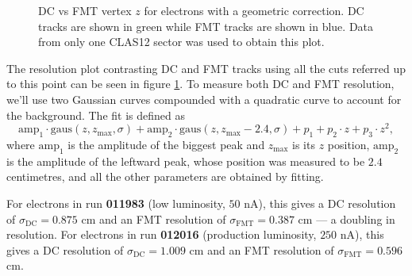     \begin{figure}[b!]
        \centering{}
        \caption[DC vs FMT $z$ with geometry correction]{DC vs FMT vertex $z$ for electrons with a geometric correction. DC tracks are shown in green while FMT tracks are shown in blue. Data from only one CLAS12 sector was used to obtain this plot.}
        \label{fig::dc_vs_fmt_vz_corrected}
    \end{figure}

    The resolution plot contrasting DC and FMT tracks using all the cuts referred up to this point can be seen in figure \ref{fig::dc_vs_fmt_vz_corrected}.
    To measure both DC and FMT resolution, we'll use two Gaussian curves compounded with a quadratic curve to account for the background.
    The fit is defined as
    \begin{equation*}
        \text{amp}_1 \cdot \text{gaus}(z, z_\text{max}, \sigma) + \text{amp}_2 \cdot \text{gaus}(z, z_\text{max} - 2.4, \sigma) + p_1 + p_2\cdot z + p_3\cdot z^2,
    \end{equation*}
    where $\text{amp}_1$ is the amplitude of the biggest peak and $z_\text{max}$ is its $z$ position, $\text{amp}_2$ is the amplitude of the leftward peak, whose position was measured to be $2.4$ centimetres, and all the other parameters are obtained by fitting.

    For electrons in run \textbf{011983} (low luminosity, $50$ nA), this gives a DC resolution of $\sigma_\text{DC} = 0.875$ cm and an FMT resolution of $\sigma_\text{FMT} = 0.387$ cm --- a doubling in resolution.
    For electrons in run \textbf{012016} (production luminosity, $250$ nA), this gives a DC resolution of $\sigma_\text{DC} = 1.009$ cm and an FMT resolution of $\sigma_\text{FMT} = 0.596$ cm.

